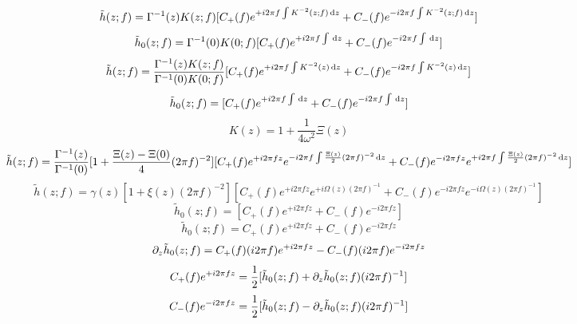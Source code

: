 \begin{equation}
    \tilde{h}(z;f)=\Gamma^{-1}(z)K(z;f)[C_+(f)e^{+i2\pi f\int K^{-2}(z;f)\,\mathrm{d} z}+C_-(f)e^{-i2\pi f\int K^{-2}(z;f)\,\mathrm{d} z}]
\end{equation}
\begin{equation}
    \tilde{h}_0(z;f)=\Gamma^{-1}(0)K(0;f)[C_+(f)e^{+i2\pi f\int\,\mathrm{d} z}+C_-(f)e^{-i2\pi f\int\,\mathrm{d} z}]
\end{equation}
\begin{equation}
    \tilde{h}(z;f)=\frac{\Gamma^{-1}(z)K(z;f)}{\Gamma^{-1}(0)K(0;f)}[C_+(f)e^{+i2\pi f\int K^{-2}(z)\,\mathrm{d} z}+C_-(f)e^{-i2\pi f\int K^{-2}(z)\,\mathrm{d} z}]
\end{equation}
\begin{equation}
    \tilde{h}_0(z;f)=[C_+(f)e^{+i2\pi f\int\,\mathrm{d} z}+C_-(f)e^{-i2\pi f\int\,\mathrm{d} z}]
\end{equation}
\begin{equation}
    K(z)=1+\frac{1}{4\omega^2}\Xi(z)
\end{equation}
\begin{equation}
    \tilde{h}(z;f)=\frac{\Gamma^{-1}(z)}{\Gamma^{-1}(0)}[1+\frac{\Xi(z)-\Xi(0)}{4}(2\pi f)^{-2}][C_+(f)e^{+i2\pi fz}e^{-i2\pi f\int\frac{\Xi(z)}{2}(2\pi f)^{-2}\,\mathrm{d} z}+C_-(f)e^{-i2\pi fz}e^{+i2\pi f\int\frac{\Xi(z)}{2}(2\pi f)^{-2}\,\mathrm{d} z}]
\end{equation}
\begin{equation}
    \tilde{h}(z;f)=\gamma(z)[1+\xi(z)(2\pi f)^{-2}][C_+(f)e^{+i2\pi fz}e^{+i\Omega(z)(2\pi f)^{-1}}+C_-(f)e^{-i2\pi fz}e^{-i\Omega(z)(2\pi f)^{-1}}]
\end{equation}
\begin{equation}
    \tilde{h}_0(z;f)=[C_+(f)e^{+i2\pi fz}+C_-(f)e^{-i2\pi fz}]
\end{equation}
\begin{equation}
    \tilde{h}_0(z;f)=C_+(f)e^{+i2\pi fz}+C_-(f)e^{-i2\pi fz}
\end{equation}
\begin{equation}
    \partial_z\tilde{h}_0(z;f)=C_+(f)(i2\pi f)e^{+i2\pi fz}-C_-(f)(i2\pi f)e^{-i2\pi fz}
\end{equation}
\begin{equation}
    C_+(f)e^{+i2\pi fz}=\frac{1}{2}[\tilde{h}_0(z;f)+\partial_z\tilde{h}_0(z;f)(i2\pi f)^{-1}]
\end{equation}
\begin{equation}
    C_-(f)e^{-i2\pi fz}=\frac{1}{2}[\tilde{h}_0(z;f)-\partial_z\tilde{h}_0(z;f)(i2\pi f)^{-1}]
\end{equation}
